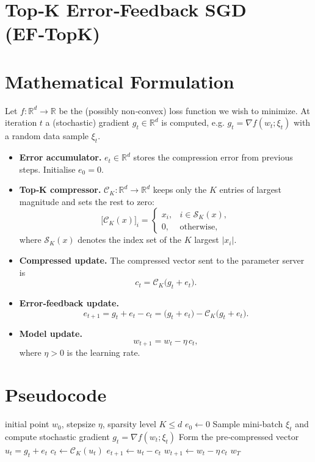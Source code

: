 \documentclass{article}
\newcommand{\C}{\mathcal{C}}
\begin{document}
\section*{Top‑K Error‑Feedback SGD (EF‑TopK)}

\section*{Mathematical Formulation}
Let $f:\mathbb{R}^{d}\rightarrow\mathbb{R}$ be the (possibly non‑convex) loss function we wish to minimize.  
At iteration $t$ a (stochastic) gradient $g_{t}\in\mathbb{R}^{d}$ is computed, e.g. $g_{t}= \nabla f(w_{t};\xi_{t})$ with a random data sample $\xi_{t}$.  

\begin{itemize}
    \item \textbf{Error accumulator.}  $e_{t}\in\mathbb{R}^{d}$ stores the compression error from previous steps.  Initialise $e_{0}=0$.
    \item \textbf{Top‑K compressor.}  $\C_{K}:\mathbb{R}^{d}\rightarrow\mathbb{R}^{d}$ keeps only the $K$ entries of largest magnitude and sets the rest to zero:
    \[
        \bigl[\C_{K}(x)\bigr]_{i}= 
        \begin{cases}
            x_{i}, & i\in\mathcal{S}_{K}(x),\\[2mm]
            0,     & \text{otherwise},
        \end{cases}
    \]
    where $\mathcal{S}_{K}(x)$ denotes the index set of the $K$ largest $|x_{i}|$.
    \item \textbf{Compressed update.}  The compressed vector sent to the parameter server is
    \[
        c_{t}= \C_{K}\!\bigl(g_{t}+e_{t}\bigr).
    \]
    \item \textbf{Error‑feedback update.}
    \[
        e_{t+1}= g_{t}+e_{t}-c_{t}= \bigl(g_{t}+e_{t}\bigr)-\C_{K}\!\bigl(g_{t}+e_{t}\bigr).
    \]
    \item \textbf{Model update.}
    \[
        w_{t+1}= w_{t}-\eta\,c_{t},
    \]
    where $\eta>0$ is the learning rate.
\end{itemize}

\section*{Pseudocode}
\begin{algorithm}[H]
\caption{EF‑TopK SGD (single‑worker version)}\label{alg:ef-topk}
\begin{algorithmic}[1]
\REQUIRE initial point $w_{0}$, stepsize $\eta$, sparsity level $K\le d$
\STATE $e_{0}\gets 0$
    \STATE Sample mini‑batch $\xi_{t}$ and compute stochastic gradient $g_{t}= \nabla f(w_{t};\xi_{t})$
    \STATE Form the pre‑compressed vector $u_{t}=g_{t}+e_{t}$
    \STATE $c_{t}\gets \C_{K}(u_{t})$ \hfill{}
    \STATE $e_{t+1}\gets u_{t}-c_{t}$ \hfill{}
    \STATE $w_{t+1}\gets w_{t}-\eta\,c_{t}$
\ENDFOR
\RETURN $w_{T}$
\end{algorithmic}
\end{algorithm}
\end{document}
